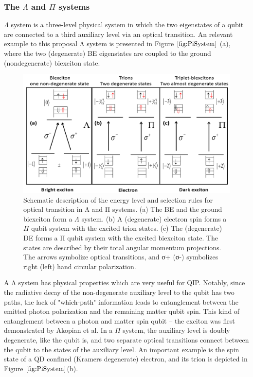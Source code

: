 \subsubsection{The $\Lambda$ and $\Pi$ systems}
$\Lambda$ system is a three-level physical system in which the two eigenstates of a qubit are connected to a third auxiliary level via an optical transition. An relevant example to this proposal Λ system is presented in Figure $\ref{fig:PiSystem}$ (a), where the two (degenerate) BE eigenstates are coupled to the ground (nondegenerate) biexciton state.
\begin{figure}[H]
	\centering
	\includegraphics[scale=0.32]{figures/pISystem.png}
	\caption{Schematic description of the energy level and selection rules for
optical transition in Λ and Π systems. (a) The BE and the ground biexciton form a $\Lambda$ system. (b) A (degenerate) electron spin forms a $\Pi$ qubit system
with the excited trion states. (c) The (degenerate) DE forms a Π qubit system
with the excited biexciton state. The states are described by their total
angular momentum projections. The arrows symbolize optical transitions, and σ+ (σ-) symbolizes right (left) hand circular polarization.}
	\label{fig:LambdaSystem}
\end{figure}
A Λ system has physical properties which are very useful for QIP. Notably, since the radiative decay of the non-degenerate auxiliary level to the qubit has two paths, the lack of "which-path" information leads to entanglement
between the emitted photon polarization and the remaining matter qubit spin. This kind of entanglement between a photon and matter spin qubit – the exciton was first demonstrated by Akopian et al. \cite{Akopian2006}
In a $\Pi$ system, the auxiliary level is doubly degenerate, like the qubit is, and two separate optical transitions connect between the qubit to the states of the auxiliary level. An important example is the spin state of a QD confined (Kramers degenerate) electron, and its trion is depicted in Figure $\ref{fig:PiSystem}$(b). 
